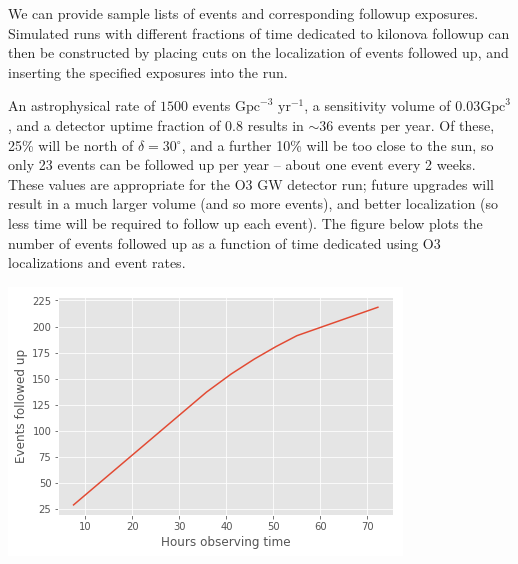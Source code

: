 \documentclass[a4paper,10pt]{article}
\newcommand{\degree}{\ensuremath{^{\circ}}}
\begin{document}
We can provide sample lists of events and corresponding followup exposures. Simulated runs with different fractions of time dedicated to kilonova followup can then be constructed by placing cuts on the localization of events followed up, and inserting the specified exposures into the run.

An astrophysical rate of $1500$ events $\mbox{Gpc}^{-3}$ $\mbox{yr}^{-1}$, a sensitivity volume of $0.03 \mbox{Gpc}^3$, and a detector uptime fraction of $0.8$ results in $\sim 36$ events per year. Of these, 25\% will be north of $\delta=30\degree$, and a further 10\% will be too close to the sun, so only 23 events can be followed up per year -- about one event every 2 weeks. These values are appropriate for the O3 GW detector run; future upgrades will result in a much larger volume (and so more events), and better localization (so less time will be required to follow up each event). The figure below plots the number of events followed up as a function of time dedicated using O3 localizations and event rates. 

\begin{minipage}{\columnwidth}
\centering
 \includegraphics[width=0.5\columnwidth]{gwtoofollowupsvstime.png}
 \label{fig:followupsvstime}
\end{minipage}

\end{document}
